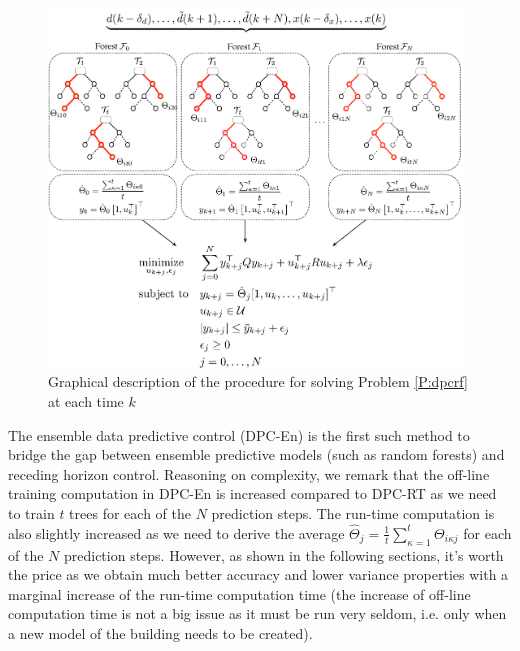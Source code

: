 \begin{figure}[t!]
	\centering
	\includegraphics[width=26pc]{figures/dpc-algo-rf.eps}
	\caption{\textcolor[rgb]{0,0,1}{Graphical description of the procedure for solving Problem \ref{P:dpcrf} at each time $k$}}
	\label{F:dpc-algo-rf}
\end{figure}

\textcolor[rgb]{0,0,1}{The ensemble data predictive control (DPC-En) is the first such method to bridge the gap between ensemble predictive models (such as random forests) and receding horizon control. Reasoning on complexity, we remark that the off-line training computation in DPC-En is increased compared to DPC-RT as we need to train $t$ trees for each of the $N$ prediction steps. The run-time computation is also slightly increased as we need to derive the average $\hat{\Theta}_{j} = \frac{1}{t}\sum\limits_{\kappa = 1}^{t} \Theta_{i \kappa j}$ for each of the $N$ prediction steps. However, as shown in the following sections, it's worth the price as we obtain much better accuracy and lower variance properties with a marginal increase of the run-time computation time (the increase of off-line computation time is not a big issue as it must be run very seldom, i.e. only when a new model of the building needs to be created).}






